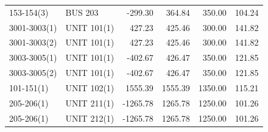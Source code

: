 \documentclass[10pt]{report}
\begin{document}
\begin{table}[H]
{\begin{tabular}{llrrrr}
153-154(3) & BUS 203 & -299.30 & 364.84 & 350.00 & 104.24 \\
3001-3003(1) & UNIT 101(1) & 427.23 & 425.46 & 300.00 & 141.82 \\
3001-3003(2) & UNIT 101(1) & 427.23 & 425.46 & 300.00 & 141.82 \\
3003-3005(1) & UNIT 101(1) & -402.67 & 426.47 & 350.00 & 121.85 \\
3003-3005(2) & UNIT 101(1) & -402.67 & 426.47 & 350.00 & 121.85 \\
101-151(1) & UNIT 102(1) & 1555.39 & 1555.39 & 1350.00 & 115.21 \\
205-206(1) & UNIT 211(1) & -1265.78 & 1265.78 & 1250.00 & 101.26 \\
205-206(1) & UNIT 212(1) & -1265.78 & 1265.78 & 1250.00 & 101.26 \\
\bottomrule
\end{tabular}}
\end{table}
\end{document}

